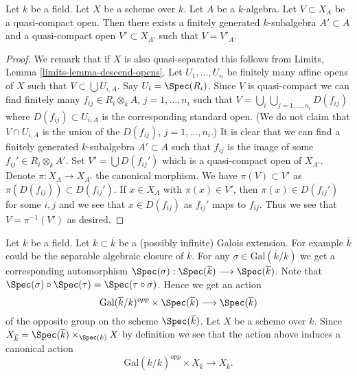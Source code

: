 \begin{lemma}
\label{lemma-descend-open}
Let $k$ be a field.
Let $X$ be a scheme over $k$.
Let $A$ be a $k$-algebra.
Let $V \subset X_A$ be a quasi-compact open.
Then there exists a finitely generated $k$-subalgebra $A' \subset A$
and a quasi-compact open $V' \subset X_{A'}$
such that $V = V'_A$.
\end{lemma}

\begin{proof}
We remark that if $X$ is also quasi-separated this follows from
Limits, Lemma \ref{limits-lemma-descend-opens}. Let
$U_1, \ldots, U_n$ be finitely many affine opens of $X$
such that $V \subset \bigcup U_{i, A}$. Say $U_i = \Spec(R_i)$.
Since $V$ is quasi-compact we can find finitely many
$f_{ij} \in R_i \otimes_k A$, $j = 1, \ldots, n_i$
such that $V = \bigcup_i \bigcup_{j = 1, \ldots, n_i} D(f_{ij})$
where $D(f_{ij}) \subset U_{i, A}$ is the corresponding standard
open. (We do not claim that $V \cap U_{i, A}$ is the union
of the $D(f_{ij})$, $j = 1, \ldots, n_i$.)
It is clear that we can find a finitely generated $k$-subalgebra
$A' \subset A$ such that $f_{ij}$ is the image of some
$f_{ij}' \in R_i \otimes_k A'$.
Set $V' = \bigcup D(f_{ij}')$ which is a quasi-compact open of $X_{A'}$.
Denote $\pi : X_A \to X_{A'}$ the canonical morphism.
We have $\pi(V) \subset V'$ as $\pi(D(f_{ij})) \subset D(f_{ij}')$.
If $x \in X_A$ with $\pi(x) \in V'$, then $\pi(x) \in D(f_{ij}')$
for some $i, j$ and we see that $x \in D(f_{ij})$ as $f_{ij}'$
maps to $f_{ij}$. Thus we see that $V = \pi^{-1}(V')$ as desired.
\end{proof}

\noindent
Let $k$ be a field. Let $k \subset \overline{k}$ be a (possibly infinite)
Galois extension. For example $\overline{k}$ could be the
separable algebraic closure of $k$.
For any $\sigma \in \text{Gal}(\overline{k}/k)$ we get a corresponding
automorphism
$
\Spec(\sigma) :
\Spec(\overline{k})
\longrightarrow
\Spec(\overline{k})
$.
Note that
$\Spec(\sigma) \circ \Spec(\tau) = \Spec(\tau \circ \sigma)$.
Hence we get an action
$$
\text{Gal}(\overline{k}/k)^{opp} \times \Spec(\overline{k})
\longrightarrow
\Spec(\overline{k})
$$
of the opposite group on the scheme $\Spec(\overline{k})$.
Let $X$ be a scheme over $k$. Since
$X_{\overline{k}} =
\Spec(\overline{k}) \times_{\Spec(k)} X$
by definition we see that the action above induces a canonical action
\begin{equation}
\label{equation-galois-action-base-change-kbar}
\text{Gal}(\overline{k}/k)^{opp} \times X_{\overline{k}}
\longrightarrow
X_{\overline{k}}.
\end{equation}

